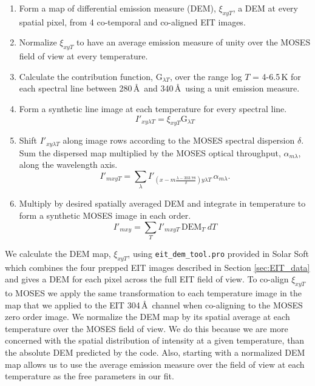 			\begin{enumerate}
				\item Form a map of differential emission measure (DEM), $\xi_{xyT}$, a DEM at every spatial pixel, from 4 co-temporal and co-aligned EIT images.
				
				\item Normalize $\xi_{xyT}$ to have an average emission measure of unity over the MOSES field of view at every temperature.
				
				\item Calculate the contribution function, G$_{\lambda T}$, over the range log $T$ = 4-6.5\,K for each spectral line between 280\,\AA \ and 340\,\AA\ using a unit emission measure.
				
				\item Form a synthetic line image at each temperature for every spectral line.
				    \begin{equation}
				        I'_{xy\lambda T} = \xi_{xyT}\text{G}_{\lambda T}
				    \end{equation}

				
				\item Shift $I'_{xy\lambda T}$ along image rows according to the MOSES spectral dispersion $\delta$. 
				Sum the dispersed map multiplied by the  MOSES optical throughput, $\alpha_{m\lambda}$, along the wavelength axis.
					\begin{equation}
						I'_{mxyT} = \sum_{\lambda}I'_{(x-m\frac{\lambda - 303.78}{\delta})y\lambda T}\, \alpha_{m\lambda}.
					\end{equation}
				
				\item Multiply by desired spatially averaged DEM and integrate in temperature to form a synthetic MOSES image in each order. 
					\begin{equation}
						I'_{mxy} = \sum_{T} I'_{mxyT}\, \text{DEM}_T\ dT
					\end{equation}
			\end{enumerate} 
		
	
		We calculate the DEM map, $\xi_{xyT}$, using \texttt{eit\_dem\_tool.pro} provided in Solar Soft which combines the four prepped EIT images described in Section \ref{sec:EIT_data} and gives a DEM for each pixel across the full EIT field of view.
		To co-align $\xi_{xyT}$ to MOSES we apply the same transformation to each temperature image in the map that we applied to the EIT 304\,\AA\ channel when co-aligning to the MOSES zero order image.
		We normalize the DEM map by its spatial average at each temperature over the MOSES field of view.
		We do this because we are more concerned with the spatial distribution of intensity at a given temperature, than the absolute DEM predicted by the code.
		Also, starting with a normalized DEM map allows us to use the average emission measure over the field of view at each temperature as the free parameters in our fit.

